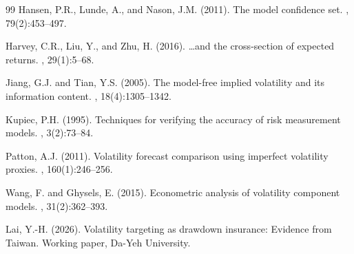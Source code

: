 \documentclass[12pt,a4paper]{article}
\begin{document}
\begin{thebibliography}{99}
Hansen, P.R., Lunde, A., and Nason, J.M. (2011).
\newblock The model confidence set.
, 79(2):453--497.

Harvey, C.R., Liu, Y., and Zhu, H. (2016).
\newblock \ldots and the cross-section of expected returns.
, 29(1):5--68.

Jiang, G.J. and Tian, Y.S. (2005).
\newblock The model-free implied volatility and its information content.
, 18(4):1305--1342.

Kupiec, P.H. (1995).
\newblock Techniques for verifying the accuracy of risk measurement models.
, 3(2):73--84.

Patton, A.J. (2011).
\newblock Volatility forecast comparison using imperfect volatility proxies.
, 160(1):246--256.

Wang, F. and Ghysels, E. (2015).
\newblock Econometric analysis of volatility component models.
, 31(2):362--393.

Lai, Y.-H. (2026).
\newblock Volatility targeting as drawdown insurance: Evidence from Taiwan.
\newblock Working paper, Da-Yeh University.

\end{thebibliography}
\end{document}
